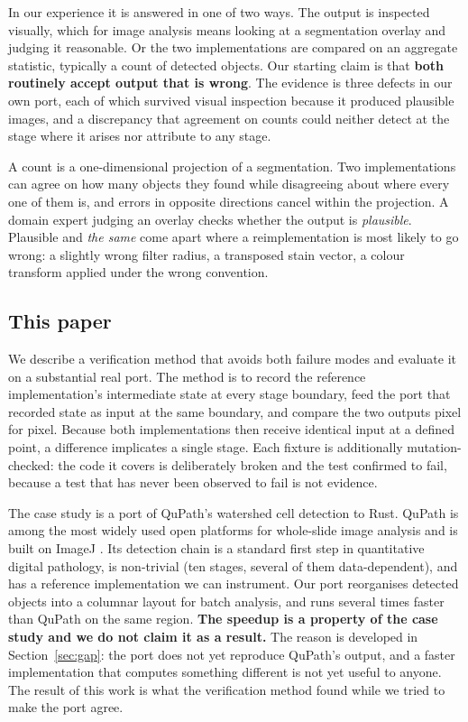 \documentclass[11pt,a4paper]{article}
\begin{document}
In our experience it is answered in one of two ways. The output is inspected
visually, which for image analysis means looking at a segmentation overlay and
judging it reasonable. Or the two implementations are compared on an aggregate
statistic, typically a count of detected objects. Our starting claim is that
\textbf{both routinely accept output that is wrong}. The evidence is three
defects in our own port, each of which survived visual inspection because it
produced plausible images, and a discrepancy that agreement on counts could
neither detect at the stage where it arises nor attribute to any stage.

A count is a one-dimensional projection of a segmentation. Two implementations
can agree on how many objects they found while disagreeing about where every
one of them is, and errors in opposite directions cancel within the projection.
A domain expert judging an overlay checks whether the output is
\emph{plausible}. Plausible and \emph{the same} come apart where a
reimplementation is most likely to go wrong: a slightly wrong filter radius, a
transposed stain vector, a colour transform applied under the wrong convention.

\subsection*{This paper}

We describe a verification method that avoids both failure modes and evaluate
it on a substantial real port. The method is to record the reference
implementation's intermediate state at every stage boundary, feed the port that
recorded state as input at the same boundary, and compare the two outputs pixel
for pixel. Because both implementations then receive identical input at a
defined point, a difference implicates a single stage. Each fixture is
additionally mutation-checked: the code it covers is deliberately broken and
the test confirmed to fail, because a test that has never been observed to fail
is not evidence.

The case study is a port of QuPath's watershed cell detection to Rust. QuPath
\cite{bankhead2017qupath} is among the most widely used open platforms for
whole-slide image analysis and is built on ImageJ \cite{schneider2012nih}. Its
detection chain is a standard first step in quantitative digital pathology, is
non-trivial (ten stages, several of them data-dependent), and has a reference
implementation we can instrument. Our port reorganises detected objects into a
columnar layout for batch analysis, and runs several times faster than QuPath
on the same region. \textbf{The speedup is a property of the case study and we
do not claim it as a result.} The reason is developed in Section~\ref{sec:gap}:
the port does not yet reproduce QuPath's output, and a faster implementation
that computes something different is not yet useful to anyone. The result of
this work is what the verification method found while we tried to make the port
agree.
\end{document}
